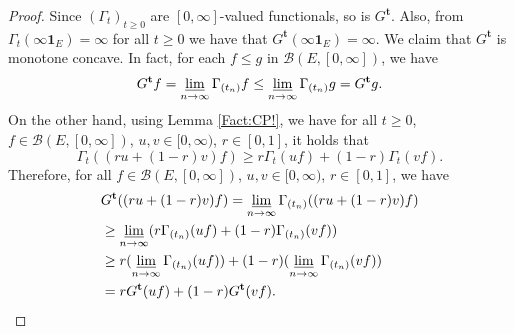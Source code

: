 \documentclass[12pt,a4paper]{amsart}
\numberwithin{equation}{section}
\theoremstyle{plain}
\theoremstyle{definition}
\theoremstyle{remark}
\begin{document}
\begin{proof}
	Since $(\Gamma_t)_{t\geq 0}$ are $[0,\infty]$-valued functionals, so is $G^{\mathbf t}$.
	Also, from $\Gamma_t(\infty \mathbf 1_E) = \infty$ for all $t\geq 0$ we have that $G^{\mathbf t}(\infty \mathbf 1_E) = \infty$.
	We claim that $G^\mathbf t$ is monotone concave.
	In fact, for each $f \leq g$ in $\mathcal B(E,[0,\infty])$, we have
\begin{equation}
	G^{\mathbf t} f
	= \varliminf_{n\to \infty} \Gamma_{(t_n)} f
	\leq \varliminf_{n\to \infty} \Gamma_{(t_n)} g
	= G^{\mathbf t} g.
\end{equation}
	On the other hand, using Lemma \ref{Fact:CP!}, we have for all $t\geq 0$, $f\in \mathcal B(E,[0,\infty])$, $u,v \in [0,\infty)$, $r\in [0,1]$, it holds that
\begin{equation}
	\Gamma_t((ru+(1-r) v)f)
	\geq r \Gamma_t (uf) + (1-r) \Gamma_t (vf).
\end{equation}
	Therefore, for all $f\in \mathcal B(E,[0,\infty])$, $u,v \in [0,\infty)$, $r \in [0,1]$, we have
\begin{align}
	& G^{\mathbf t}((ru + (1-r)v)f)
	= \varliminf_{n \to \infty} \Gamma_{(t_n)}((ru + (1-r)v)f)
	\\&\geq \varliminf_{n\to \infty} (r\Gamma_{(t_n)} (uf) + (1-r)\Gamma_{(t_n)}(vf))
	\\&\geq r (\varliminf_{n\to \infty} \Gamma_{(t_n)} (uf)) + (1-r) (\varliminf_{n\to \infty} \Gamma_{(t_n)}(vf) )
	\\&= r G^{\mathbf t} (uf) + (1-r) G^{\mathbf t}(vf).
\end{align}
	

\end{proof}
\end{document}
